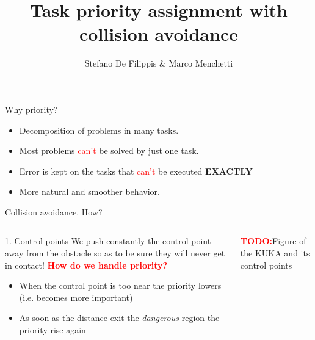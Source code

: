 \documentclass[11pt]{beamer}
\author[Stefano, Marco]{Stefano De Filippis \& Marco Menchetti}
\title[ROB2 project]{Task priority assignment with collision avoidance}
\institute[Sapienza]{Sapienza - University of Rome}
\date{}
\newcommand{\todo}{\textcolor{red}{\textbf{TODO:}}}
\begin{document}
\begin{frame}
\titlepage
\end{frame}


\begin{frame}{Why priority?}
\begin{itemize}
\item Decomposition of problems in many tasks.
\item Most problems \textcolor{red}{can't} be solved by just one task.
\item Error is kept on the tasks that \textcolor{red}{can't} be executed	\textbf{EXACTLY} 
\item More natural and smoother behavior.
\end{itemize}
\end{frame}

\begin{frame}{Collision avoidance. How?}
\begin{columns}
\begin{column}{.5\textwidth}
\begin{block}{1. Control points}
We push constantly the control point away from the obstacle so as to be sure they will never get in contact!
\textbf{\textcolor{red}{How do we handle priority?}}
\begin{itemize}
\item When the control point is too near the priority lowers (i.e. becomes more important)
\item As soon as the distance exit the \emph{dangerous} region the priority rise again
\end{itemize}
\end{block}
\end{column}
\begin{column}{.5\textwidth}
\todo Figure of the KUKA and its control points
\end{column}
\end{columns}
\end{frame}
\end{document}
